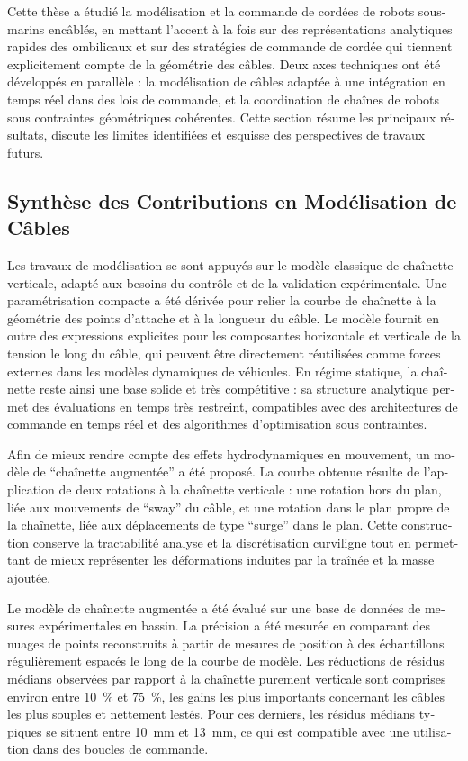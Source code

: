 \begin{otherlanguage}{french}
	Cette thèse a étudié la modélisation et la commande de cordées de robots sous-marins encâblés, en
	mettant l'accent à la fois sur des représentations analytiques rapides des ombilicaux et sur des
	stratégies de commande de cordée qui tiennent explicitement compte de la géométrie des câbles. Deux
	axes techniques ont été développés en parallèle : la modélisation de câbles adaptée à une
	intégration en temps réel dans des lois de commande, et la coordination de chaînes de robots sous
	contraintes géométriques cohérentes. Cette section résume les principaux résultats, discute les
	limites identifiées et esquisse des perspectives de travaux futurs.

	\subsection{Synthèse des Contributions en Modélisation de Câbles}

	Les travaux de modélisation se sont appuyés sur le modèle classique de chaînette verticale, adapté
	aux besoins du contrôle et de la validation expérimentale. Une paramétrisation compacte a été
	dérivée pour relier la courbe de chaînette à la géométrie des points d'attache et à la longueur du
	câble. Le modèle fournit en outre des expressions explicites pour les composantes horizontale et
	verticale de la tension le long du câble, qui peuvent être directement réutilisées comme forces
	externes dans les modèles dynamiques de véhicules. En régime statique, la chaînette reste ainsi une
	base solide et très compétitive : sa structure analytique permet des évaluations en temps très
	restreint, compatibles avec des architectures de commande en temps réel et des algorithmes
	d'optimisation sous contraintes.

	Afin de mieux rendre compte des effets hydrodynamiques en mouvement, un modèle de
	\enquote{chaînette augmentée} a été proposé. La courbe obtenue résulte de l'application de deux
	rotations à la chaînette verticale : une rotation hors du plan, liée aux mouvements de
	\enquote{sway} du câble, et une rotation dans le plan propre de la chaînette, liée aux déplacements
	de type \enquote{surge} dans le plan. Cette construction conserve la tractabilité analyse et la
	discrétisation curviligne tout en permettant de mieux représenter les déformations induites par la
	traînée et la masse ajoutée.

	Le modèle de chaînette augmentée a été évalué sur une base de données de mesures expérimentales en
	bassin. La précision a été mesurée en comparant des nuages de points reconstruits à partir de
	mesures de position à des échantillons régulièrement espacés le long de la courbe de modèle. Les
	réductions de résidus médians observées par rapport à la chaînette purement verticale sont
	comprises environ entre \qty{10}{\percent} et \qty{75}{\percent}, les gains les plus importants
	concernant les câbles les plus souples et nettement lestés. Pour ces derniers, les résidus médians
	typiques se situent entre \qty{10}{\milli\meter} et \qty{13}{\milli\meter}, ce qui est compatible
	avec une utilisation dans des boucles de commande.


\end{otherlanguage}
